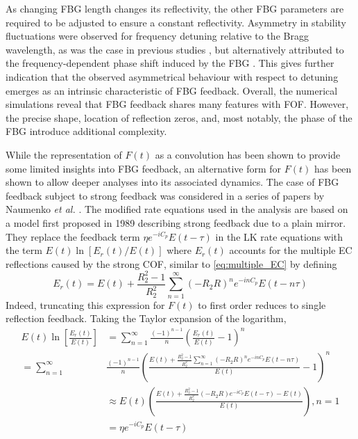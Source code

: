 As changing FBG length changes its reflectivity, the other FBG parameters are required to be adjusted to ensure a constant reflectivity. 
Asymmetry in stability fluctuations were observed for frequency detuning relative to the Bragg wavelength, as was the case in previous studies \cite{li2012distributed}, but alternatively attributed to the frequency-dependent phase shift induced by the FBG \cite{skenderas2024impact, skenderas2021feedback}. 
This gives further indication that the observed asymmetrical behaviour with respect to detuning emerges as an intrinsic characteristic of FBG feedback. Overall, the numerical simulations reveal that FBG feedback shares many features with FOF. 
However, the precise shape, location of reflection zeros, and, most notably, the phase of the FBG introduce additional complexity. 
%
\par
%
While the representation of $F(t)$ as a convolution has been shown to provide some limited insights into FBG feedback, an alternative form for $F(t)$ has been shown to allow deeper analyses into its associated dynamics. 
The case of FBG feedback subject to strong feedback was considered in a series of papers by Naumenko \textit{et al.} \cite{naumenko2003characteristics, naumenko2004slow, besnard2002intensity}. 
The modified rate equations used in the analysis are based on a model first proposed in 1989 \cite{rong1989improved} describing strong feedback due to a plain mirror. 
They replace the feedback term $\eta e^{-i C_p} E(t-\tau)$ in the LK rate equations with the term $E(t) \ln{\left[ E_r(t) / E(t) \right]}$ where $E_r(t)$ accounts for the multiple EC reflections caused by the strong COF, 
similar to \eqref{eq:multiple_EC} by defining
%
\begin{equation*}
    E_r(t) = E(t) + \frac{R_2^2 - 1}{R_2^2} \sum_{n=1}^\infty (-R_2 R)^n e^{-i n C_p} E(t-n \tau)
\end{equation*}
%
Indeed, truncating this expression for $F(t)$ to first order reduces to single reflection feedback. Taking the Taylor expansion of the logarithm,
%
\begin{equation*}
    \begin{aligned}
        E(t) \ln{\left[ \frac{E_r(t)}{E(t)} \right]} &= \sum_{n=1}^\infty \frac{(-1)^{n-1}}{n}\left( \frac{E_r(t)}{E(t)} - 1\right)^n \\
        = \sum_{n=1}^\infty &\frac{(-1)^{n-1}}{n}\left( \frac{E(t) + \frac{R_2^2 - 1}{R_2^2} \sum_{n=1}^\infty (-R_2 R)^n e^{-i n C_p} E(t-n \tau)}{E(t)} - 1\right)^n\\
        &\approx E(t)\left( \frac{E(t) + \frac{R_2^2 - 1}{R_2^2}(-R_2 R)e^{-i C_p} E(t - \tau) - E(t)}{E(t)} \right), n=1 \\
        &= \eta e^{-i C_p} E(t - \tau)
    \end{aligned}   
\end{equation*}
